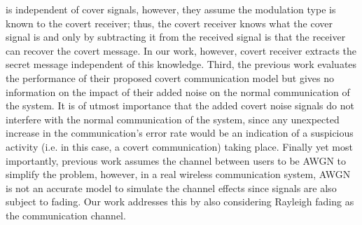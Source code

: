 is independent of cover signals, however, they assume the modulation type is known to the covert receiver; thus, the covert receiver knows what the cover signal is and only by subtracting it from the received signal is that the receiver can recover the covert message. In our work, however, covert receiver extracts the secret message independent of this knowledge. Third, the previous work evaluates the performance of their proposed covert communication model but gives no information on the impact of their added noise on the normal communication of the system. It is of utmost importance that the added covert noise signals do not interfere with the normal communication of the system, since any unexpected increase in the communication's error rate would be an indication of a suspicious activity (i.e. in this case, a covert communication) taking place. Finally yet most importantly, previous work assumes the channel between users to be AWGN to simplify the problem, however, in a real wireless communication system, AWGN is not an accurate model to simulate the channel effects since signals are also subject to fading. Our work addresses this by also considering Rayleigh fading as the communication channel.